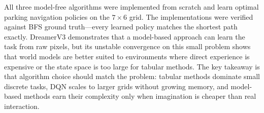 \documentclass[letterpaper]{article}
\begin{document}
All three model-free algorithms were implemented from scratch and learn optimal parking navigation policies on the $7 \times 6$ grid. The implementations were verified against BFS ground truth---every learned policy matches the shortest path exactly. DreamerV3 demonstrates that a model-based approach can learn the task from raw pixels, but its unstable convergence on this small problem shows that world models are better suited to environments where direct experience is expensive or the state space is too large for tabular methods. The key takeaway is that algorithm choice should match the problem: tabular methods dominate small discrete tasks, DQN scales to larger grids without growing memory, and model-based methods earn their complexity only when imagination is cheaper than real interaction.


\end{document}
